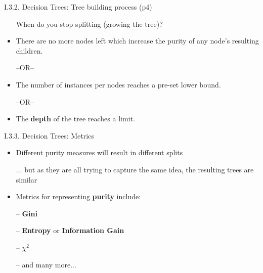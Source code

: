\documentclass[handout]{beamer}
\newcommand{\strong}[1]{\textbf{\color{teal} #1}}
\begin{document}
\begin{frame}{I.3.2. Decision Trees: Tree building process (p4)}
\begin{itemize}
\item[] When do you stop splitting (growing the tree)?
\item[]
\item There are no more nodes left which increase the purity of any node's resulting children.
\item[--OR--]
\item The number of instances per nodes reaches a pre-set lower bound.
\item[--OR--]
\item The \strong{depth} of the tree reaches a limit.
\end{itemize}
\end{frame}
\begin{frame}{I.3.3. Decision Trees: Metrics}
\begin{itemize}
\item Different purity measures will result in different splits
\item[] ... but as they are all trying to capture the same idea, the resulting trees are similar
\item[]
\item Metrics for representing \strong{purity} include:
\item[--] \strong{Gini}
\item[--] \strong{Entropy} or \strong{Information Gain}
\item[--] \strong{$\chi^2$}
\item[--] and many more...
\end{itemize}
\end{frame}
\end{document}
